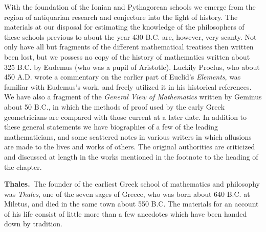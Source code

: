 \documentclass[12pt,oneside]{book}
\begin{document}
With the foundation of the Ionian and Pythagorean schools we emerge from the region of antiquarian research and conjecture into the light of history. The materials at our disposal for estimating the knowledge of the philosophers of these schools previous to about the year 430 B.C. are, however, very scanty. Not only have all but fragments of the different mathematical treatises then written been lost, but we possess no copy of the history of mathematics written about 325 B.C. by Eudemus (who was a pupil of Aristotle). Luckily Proclus, who about 450 A.D. wrote a commentary on the earlier part of Euclid's \textit{Elements}, was familiar with Eudemus's work, and freely utilized it in his historical references. We have also a fragment of the \textit{General View of Mathematics} written by Geminus about 50 B.C., in which the methods of proof used by the early Greek geometricians are compared with those current at a later date. In addition to these general statements we have biographies of a few of the leading mathematicians, and some scattered notes in various writers in which allusions are made to the lives and works of others. The original authorities are criticized and discussed at length in the works mentioned in the footnote to the heading of the chapter. \par 


\textbf{Thales.}\footnotemark\,  The founder of the earliest Greek school of mathematics and philosophy was \textit{Thales}, one of the seven sages of Greece, who was born about 640 B.C. at Miletus, and died in the same town about 550 B.C. The materials for an account of his life consist of little more than a few anecdotes which have been handed down by tradition. \par 

\end{document}
